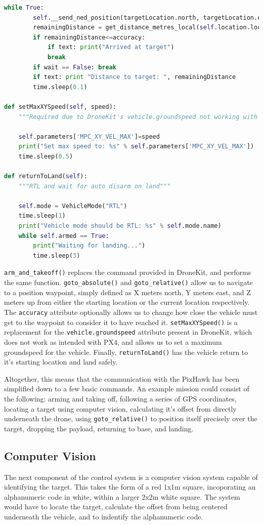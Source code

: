 \documentclass[11pt]{article}
\begin{document}
\begin{lstlisting}[language=Python]
    while True:
        self.__send_ned_position(targetLocation.north, targetLocation.east, targetLocation.down)
        remainingDistance = get_distance_metres_local(self.location.local_frame, targetLocation)
        if remainingDistance<=accuracy:
            if text: print("Arrived at target")
            break
        if wait == False: break
        if text: print "Distance to target: ", remainingDistance
        time.sleep(0.1)

def setMaxXYSpeed(self, speed):
    """Required due to DroneKit's vehicle.groundspeed not working with PX4"""

    self.parameters['MPC_XY_VEL_MAX']=speed
    print("Set max speed to: %s" % self.parameters['MPC_XY_VEL_MAX'])
    time.sleep(0.5)

def returnToLand(self):
    """RTL and wait for auto disarm on land"""

    self.mode = VehicleMode("RTL")
    time.sleep(1)
    print("Vehicle mode should be RTL: %s" % self.mode.name)
    while self.armed == True:
        print("Waiting for landing...")
        time.sleep(3)
\end{lstlisting}

\lstinline|arm_and_takeoff()| replaces the command provided in DroneKit, and performs the same function. \lstinline|goto_absolute()| and \lstinline|goto_relative()| allow us to navigate to a position waypoint, simply defined as X meters north, Y meters east, and Z meters up from either the starting location or the current location respectively. The \lstinline|accuracy| attribute optionally allows us to change how close the vehicle must get to the waypoint to consider it to have reached it. \lstinline|setMaxXYSpeed()| is a replacement for the \lstinline|vehicle.groundspeed| attribute present in DroneKit, which does not work as intended with PX4, and allows us to set a maximum groundspeed for the vehicle. Finally, \lstinline|returnToLand()| has the vehicle return to it's starting location and land safely.

Altogether, this means that the communication with the PixHawk has been simplified down to a few basic commands. An example mission could consist of the following: arming and taking off, following a series of GPS coordinates, locating a target using computer vision, calculating it's offset from directly underneath the drone, using \lstinline|goto_relative()| to position itself precisely over the target, dropping the payload, returning to base, and landing.


\subsection{Computer Vision}
The next component of the control system is a computer vision system capable of identifying the target. This takes the form of a red 1x1m square, incoporating an alphanumeric code in white, within a larger 2x2m white square\cite{IMechE_rules}. The system would have to locate the target, calculate the offset from being centered underneath the vehicle, and to indentify the alphanumeric code.
\end{document}
